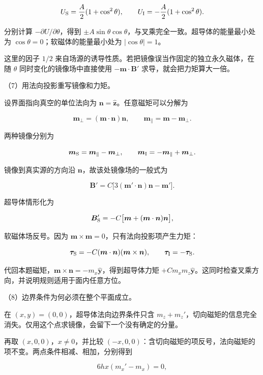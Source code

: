 \documentclass[12pt,a4paper,fontset=fandol]{ctexart}
\begin{document}
\[
U_{\rm S}=\frac A2(1+\cos^2\theta),\qquad
U_{\rm I}=-\frac A2(1+\cos^2\theta).
\]

分别计算 \(-\partial U/\partial\theta\)，得到
\(\pm A\sin\theta\cos\theta\)，与叉乘完全一致。超导体的能量最小处为
\(\cos\theta=0\)；软磁体的能量最小处为 \(|\cos\theta|=1\)。

这里的因子 \(1/2\)
来自场源的诱导性质。若把镜像误当作固定的独立永久磁体，在随 \(\theta\)
同时变化的镜像场中直接使用 \(-\boldsymbol m\cdot\boldsymbol B'\)
求导，就会把力矩算大一倍。

（7）用法向投影重写镜像和力矩。

设界面指向真空的单位法向为
\(\boldsymbol n=\hat{\boldsymbol z}\)。任意磁矩可以分解为

\[
\boldsymbol m_\perp=(\boldsymbol m\cdot\boldsymbol n)\boldsymbol n,\qquad
\boldsymbol m_\parallel=\boldsymbol m-\boldsymbol m_\perp.
\]

两种镜像分别为

\[
\boldsymbol m_{\rm S}=\boldsymbol m_\parallel-\boldsymbol m_\perp,\qquad
\boldsymbol m_{\rm I}=-\boldsymbol m_\parallel+\boldsymbol m_\perp.
\]

镜像到真实源的方向沿 \(\boldsymbol n\)，故该处镜像场的一般式为

\[
\boldsymbol B'=C\big[
3(\boldsymbol m'\cdot\boldsymbol n)\boldsymbol n-\boldsymbol m'\big].
\]

超导体情形化为

\[
\boldsymbol B'_{\rm S}
=-C\big[\boldsymbol m+(\boldsymbol m\cdot\boldsymbol n)\boldsymbol n\big],
\]

软磁体场反号。因为
\(\boldsymbol m\times\boldsymbol m=0\)，只有法向投影项产生力矩：

\[
\boldsymbol\tau_{\rm S}
=-C(\boldsymbol m\cdot\boldsymbol n)(\boldsymbol m\times\boldsymbol n),
\qquad
\boldsymbol\tau_{\rm I}=-\boldsymbol\tau_{\rm S}.
\]

代回本题磁矩，\(\boldsymbol m\times\boldsymbol n=-m_x\hat{\boldsymbol y}\)，得到超导体力矩
\(+Cm_xm_z\hat{\boldsymbol y}\)。这同时检查叉乘方向，并说明规则适用于面内任意方位。

（8）边界条件为何必须在整个平面成立。

在 \((x,y)=(0,0)\)，超导体法向边界条件只含
\(m_z+m_z'\)，切向磁矩的信息完全消失。仅用这个点求镜像，会留下一个没有确定的分量。

再取 \((x,0,0)\)，\(x\ne0\)，并比较
\((-x,0,0)\)：含切向磁矩的项反号，法向磁矩的项不变。两点条件相减、相加，分别得到

\[
6hx(m_x'-m_x)=0,
\]
\end{document}
